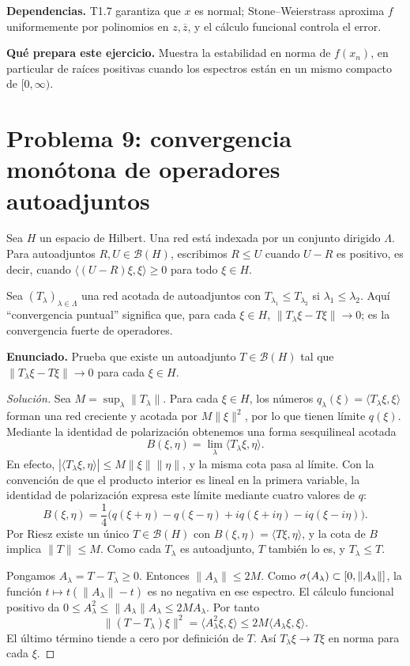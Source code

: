 \noindent\textbf{Dependencias.} T1.7 garantiza que $x$ es normal; Stone--Weierstrass aproxima $f$ uniformemente por polinomios en $z,\overline z$, y el cálculo funcional controla el error.

\noindent\textbf{Qué prepara este ejercicio.} Muestra la estabilidad en norma de $f(x_n)$, en particular de raíces positivas cuando los espectros están en un mismo compacto de $[0,\infty)$.

\section{Problema 9: convergencia monótona de operadores autoadjuntos}

Sea $H$ un espacio de Hilbert. Una red está indexada por un conjunto dirigido $\Lambda$.
Para autoadjuntos $R,U\in\mathcal B(H)$, escribimos $R\le U$ cuando $U-R$ es positivo,
es decir, cuando $\langle(U-R)\xi,\xi\rangle\ge0$ para todo $\xi\in H$.


Sea $(T_\lambda)_{\lambda\in\Lambda}$ una red acotada de autoadjuntos con
$T_{\lambda_1}\le T_{\lambda_2}$ si $\lambda_1\le\lambda_2$.
Aquí ``convergencia puntual'' significa que, para cada $\xi\in H$,
$\|T_\lambda\xi-T\xi\|\to0$; es la convergencia fuerte de operadores.

\noindent\textbf{Enunciado.} Prueba que existe un autoadjunto $T\in\mathcal B(H)$ tal que $\|T_\lambda\xi-T\xi\|\to0$ para cada $\xi\in H$.

\begin{proof}[Solución]
Sea $M=\sup_\lambda\|T_\lambda\|$. Para cada $\xi\in H$, los números
$q_\lambda(\xi)=\langle T_\lambda\xi,\xi\rangle$ forman una red creciente y acotada por
$M\|\xi\|^2$, por lo que tienen límite $q(\xi)$. Mediante la identidad de polarización obtenemos
una forma sesquilineal acotada
\[
 B(\xi,\eta)=\lim_\lambda\langle T_\lambda\xi,\eta\rangle.
\]
En efecto, $|\langle T_\lambda\xi,\eta\rangle|\le M\|\xi\|\|\eta\|$, y la misma cota pasa al
límite.
Con la convención de que el producto interior es lineal en la primera variable, la identidad de
polarización expresa este límite mediante cuatro valores de $q$:
\[
 B(\xi,\eta)=\frac14\bigl(q(\xi+\eta)-q(\xi-\eta)
   +i q(\xi+i\eta)-i q(\xi-i\eta)\bigr).
\]
Por Riesz existe un único $T\in\mathcal B(H)$ con
$B(\xi,\eta)=\langle T\xi,\eta\rangle$, y la cota de $B$ implica $\|T\|\le M$.
Como cada $T_\lambda$ es autoadjunto, $T$ también lo es, y
$T_\lambda\le T$.

Pongamos $A_\lambda=T-T_\lambda\ge0$. Entonces
$\|A_\lambda\|\le 2M$. Como
$\sigma(A_\lambda)\subset[0,\|A_\lambda\|]$, la función
$t\mapsto t(\|A_\lambda\|-t)$ es no negativa en ese espectro. El cálculo funcional positivo
da $0\le A_\lambda^2\le\|A_\lambda\|A_\lambda\le2M A_\lambda$. Por tanto
\[
\|(T-T_\lambda)\xi\|^2
=\langle A_\lambda^2\xi,\xi\rangle
\le2M\langle A_\lambda\xi,\xi\rangle.
\]
El último término tiende a cero por definición de $T$. Así
$T_\lambda\xi\to T\xi$ en norma para cada $\xi$.
\end{proof}

